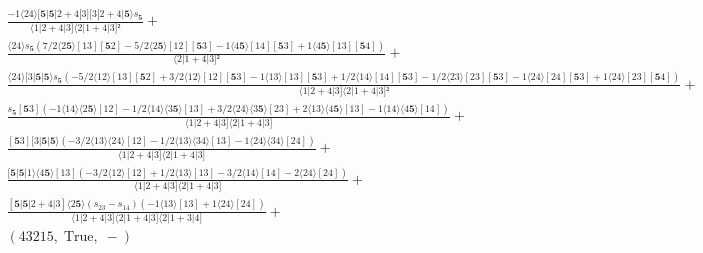 \documentclass[varwidth, border=5pt]{standalone}
\begin{document}
\begin{my}
$\begin{gathered}
\scriptscriptstyle\frac{-1⟨24⟩[𝟓|𝟓|2+4|3][3|2+4|𝟓⟩s_{𝟓}}{⟨1|2+4|3]⟨2|1+4|3]²} +\\
\scriptscriptstyle\frac{⟨24⟩s_{𝟓}(7/2⟨2𝟓⟩[13][𝟓2]-5/2⟨2𝟓⟩[12][𝟓3]-1⟨4𝟓⟩[14][𝟓3]+1⟨4𝟓⟩[13][𝟓4])}{⟨2|1+4|3]²} +\\
\scriptscriptstyle\frac{⟨24⟩[3|𝟓|𝟓⟩s_{𝟓}(-5/2⟨12⟩[13][𝟓2]+3/2⟨12⟩[12][𝟓3]-1⟨13⟩[13][𝟓3]+1/2⟨14⟩[14][𝟓3]-1/2⟨23⟩[23][𝟓3]-1⟨24⟩[24][𝟓3]+1⟨24⟩[23][𝟓4])}{⟨1|2+4|3]⟨2|1+4|3]²} +\\
\scriptscriptstyle\frac{s_{𝟓}[𝟓3](-1⟨14⟩⟨2𝟓⟩[12]-1/2⟨14⟩⟨3𝟓⟩[13]+3/2⟨24⟩⟨3𝟓⟩[23]+2⟨13⟩⟨4𝟓⟩[13]-1⟨14⟩⟨4𝟓⟩[14])}{⟨1|2+4|3]⟨2|1+4|3]} +\\
\scriptscriptstyle\frac{[𝟓3][3|𝟓|𝟓⟩(-3/2⟨13⟩⟨24⟩[12]-1/2⟨13⟩⟨34⟩[13]-1⟨24⟩⟨34⟩[24])}{⟨1|2+4|3]⟨2|1+4|3]} +\\
\scriptscriptstyle\frac{[𝟓|𝟓|1⟩⟨4𝟓⟩[13](-3/2⟨12⟩[12]+1/2⟨13⟩[13]-3/2⟨14⟩[14]-2⟨24⟩[24])}{⟨1|2+4|3]⟨2|1+4|3]} +\\
\scriptscriptstyle\frac{[𝟓|𝟓|2+4|3]⟨2𝟓⟩(s_{23}-s_{14})(-1⟨13⟩[13]+1⟨24⟩[24])}{⟨1|2+4|3]⟨2|1+4|3]⟨2|1+3|4]} +\\
\scriptscriptstyle(43215,\;\text{True},\;-) \phantom{+}
\end{gathered}$
\end{my}
\end{document}
